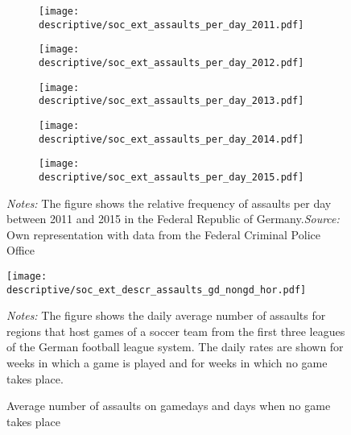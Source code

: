 \documentclass[11pt, a4paper]{article} %
\begin{document}
\vspace*{\fill}
\begin{figure}[H]\centering
	\caption{Distribution of assaults across days of the year, per year}\label{fig_soc_ext:assault_year_distribution}
	\begin{subfigure}[h]{0.48\linewidth}\centering
		\texttt{[image: descriptive/soc\_ext\_assaults\_per\_day\_2011.pdf]}
	\end{subfigure}
	\begin{subfigure}[h]{0.48\linewidth}\centering
		\texttt{[image: descriptive/soc\_ext\_assaults\_per\_day\_2012.pdf]}
	\end{subfigure}\begin{subfigure}[h]{0.48\linewidth}\centering
		\texttt{[image: descriptive/soc\_ext\_assaults\_per\_day\_2013.pdf]}
	\end{subfigure}
	\begin{subfigure}[h]{0.48\linewidth}\centering
		\texttt{[image: descriptive/soc\_ext\_assaults\_per\_day\_2014.pdf]}
	\end{subfigure}
	\begin{subfigure}[h]{0.48\linewidth}\centering
		\texttt{[image: descriptive/soc\_ext\_assaults\_per\_day\_2015.pdf]}
	\end{subfigure}
	\begin{minipage}{\linewidth}
		\scriptsize{\emph{Notes:} The figure shows the relative frequency of assaults per day between 2011 and 2015 in the Federal Republic of Germany.\newline \emph{Source:} Own representation with data from the Federal Criminal Police Office}
	\end{minipage}
\end{figure}
\vspace*{\fill}\clearpage
\vspace*{\fill}
\begin{figure}[H]\centering
	\caption{Average number of assaults on gamedays and days when no game takes place}\label{fig_soc_ext:assaults_across_dows}
	\texttt{[image: descriptive/soc\_ext\_descr\_assaults\_gd\_nongd\_hor.pdf]}
	\scriptsize
	\begin{minipage}{\linewidth}
		\emph{Notes:} The figure shows the daily average number of assaults for regions that host games of a soccer team from the first three leagues of the German football league system. The daily rates are shown for weeks in which a game is played and for weeks in which no game takes place.
	\end{minipage}
\end{figure}
\vspace*{\fill}\clearpage
\end{document}
